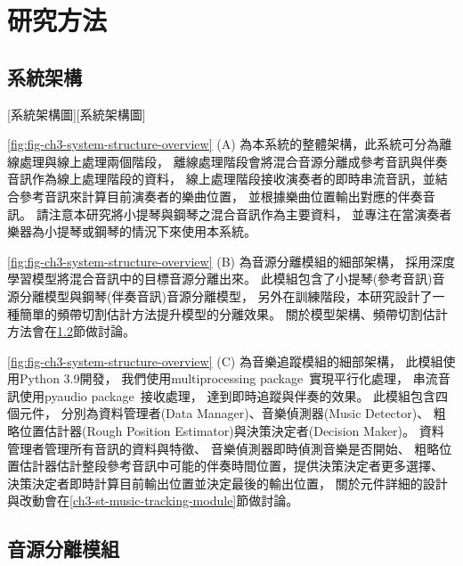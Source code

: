 \documentclass[class=NCU_thesis, crop=false]{standalone}
\begin{document}
\chapter{研究方法}

\section{系統架構} \label{ch3-st-system-structure}
[系統架構圖][系統架構圖]

\cref{fig:fig-ch3-system-structure-overview} (A)
為本系統的整體架構，此系統可分為離線處理與線上處理兩個階段，
離線處理階段會將混合音源分離成參考音訊與伴奏音訊作為線上處理階段的資料，
線上處理階段接收演奏者的即時串流音訊，並結合參考音訊來計算目前演奏者的樂曲位置，
並根據樂曲位置輸出對應的伴奏音訊。
請注意本研究將小提琴與鋼琴之混合音訊作為主要資料，
並專注在當演奏者樂器為小提琴或鋼琴的情況下來使用本系統。

\cref{fig:fig-ch3-system-structure-overview} (B)
為音源分離模組的細部架構，
採用深度學習模型將混合音訊中的目標音源分離出來。
此模組包含了小提琴(參考音訊)音源分離模型與鋼琴(伴奏音訊)音源分離模型，
另外在訓練階段，本研究設計了一種簡單的頻帶切割估計方法提升模型的分離效果。
關於模型架構、頻帶切割估計方法會在\ref{ch3-st-mss-module}節做討論。

\cref{fig:fig-ch3-system-structure-overview} (C)
為音樂追蹤模組的細部架構，
此模組使用Python 3.9開發，
我們使用multiprocessing package~\cite{python2024multiprocessing}實現平行化處理，
串流音訊使用pyaudio package~\cite{python2024pyaudio}接收處理，
達到即時追蹤與伴奏的效果。
此模組包含四個元件，
分別為資料管理者(Data Manager)、音樂偵測器(Music Detector)、
粗略位置估計器(Rough Position Estimator)與決策決定者(Decision Maker)。
資料管理者管理所有音訊的資料與特徵、
音樂偵測器即時偵測音樂是否開始、
粗略位置估計器估計整段參考音訊中可能的伴奏時間位置，提供決策決定者更多選擇、
決策決定者即時計算目前輸出位置並決定最後的輸出位置，
關於元件詳細的設計與改動會在\ref{ch3-st-music-tracking-module}節做討論。

\pagebreak

\section{音源分離模組} \label{ch3-st-mss-module}
\end{document}
